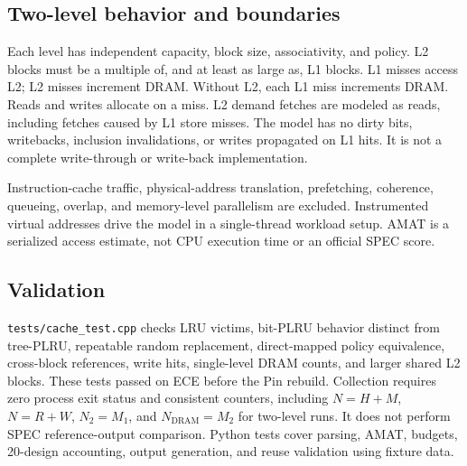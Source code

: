 \documentclass[10pt,letterpaper]{article}
\begin{document}
\subsection{Two-level behavior and boundaries}
Each level has independent capacity, block size, associativity, and policy.
L2 blocks must be a multiple of, and at least as large as, L1 blocks. L1 misses
access L2; L2 misses increment DRAM. Without L2, each L1 miss increments DRAM.
Reads and writes allocate on a miss. L2 demand fetches are modeled as reads,
including fetches caused by L1 store misses. The model has no dirty bits,
writebacks, inclusion invalidations, or writes propagated on L1 hits. It is not
a complete write-through or write-back implementation.

Instruction-cache traffic, physical-address translation, prefetching, coherence,
queueing, overlap, and memory-level parallelism are excluded. Instrumented
virtual addresses drive the model in a single-thread workload setup. AMAT is a
serialized access estimate, not CPU execution time or an official SPEC score.
\subsection{Validation}
\texttt{tests/cache\_test.cpp} checks LRU victims, bit-PLRU behavior distinct from
tree-PLRU, repeatable random replacement, direct-mapped policy equivalence,
cross-block references, write hits, single-level DRAM counts, and larger shared
L2 blocks. These tests passed on ECE before the Pin rebuild. Collection requires
zero process exit status and consistent counters, including $N=H+M$, $N=R+W$,
$N_2=M_1$, and $N_{\mathrm{DRAM}}=M_2$ for two-level runs. It does not perform
SPEC reference-output comparison. Python tests cover parsing, AMAT, budgets,
20-design accounting, output generation, and reuse validation using fixture data.

\clearpage
\end{document}
